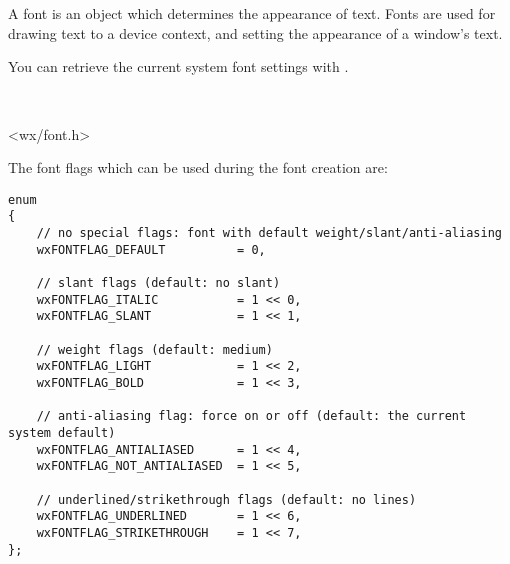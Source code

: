 \section{}\label{wxfont}

A font is an object which determines the appearance of text. Fonts are
used for drawing text to a device context, and setting the appearance of
a window's text.

You can retrieve the current system font settings with .



\\


<wx/font.h>


The font flags which can be used during the font creation are:
\begin{verbatim}
enum
{
    // no special flags: font with default weight/slant/anti-aliasing
    wxFONTFLAG_DEFAULT          = 0,

    // slant flags (default: no slant)
    wxFONTFLAG_ITALIC           = 1 << 0,
    wxFONTFLAG_SLANT            = 1 << 1,

    // weight flags (default: medium)
    wxFONTFLAG_LIGHT            = 1 << 2,
    wxFONTFLAG_BOLD             = 1 << 3,

    // anti-aliasing flag: force on or off (default: the current system default)
    wxFONTFLAG_ANTIALIASED      = 1 << 4,
    wxFONTFLAG_NOT_ANTIALIASED  = 1 << 5,

    // underlined/strikethrough flags (default: no lines)
    wxFONTFLAG_UNDERLINED       = 1 << 6,
    wxFONTFLAG_STRIKETHROUGH    = 1 << 7,
};
\end{verbatim}

